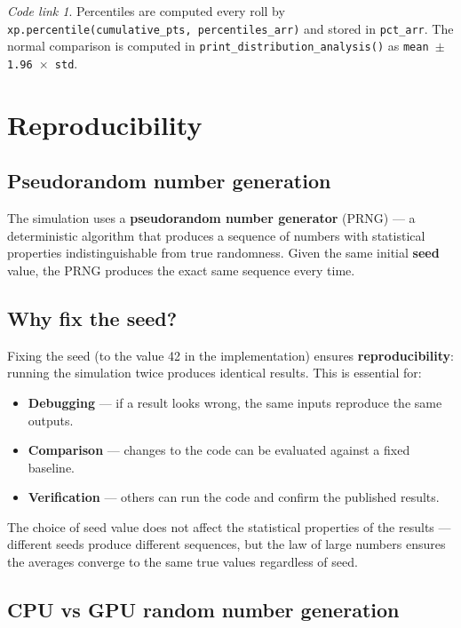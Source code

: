 \documentclass[11pt,a4paper]{article}
\theoremstyle{remark}
\newtheorem*{codelink}{Code link}
\begin{document}
\begin{codelink}
Percentiles are computed every roll by \texttt{xp.percentile(cumulative\_pts, percentiles\_arr)} and stored in \texttt{pct\_arr}. The normal comparison is computed in \texttt{print\_distribution\_analysis()} as \texttt{mean $\pm$ 1.96 $\times$ std}.
\end{codelink}

\section{Reproducibility}

\subsection{Pseudorandom number generation}

The simulation uses a \textbf{pseudorandom number generator} (PRNG) --- a deterministic algorithm that produces a sequence of numbers with statistical properties indistinguishable from true randomness. Given the same initial \textbf{seed} value, the PRNG produces the exact same sequence every time.

\subsection{Why fix the seed?}

Fixing the seed (to the value 42 in the implementation) ensures \textbf{reproducibility}: running the simulation twice produces identical results. This is essential for:
\begin{itemize}[itemsep=4pt]
\item \textbf{Debugging} --- if a result looks wrong, the same inputs reproduce the same outputs.
\item \textbf{Comparison} --- changes to the code can be evaluated against a fixed baseline.
\item \textbf{Verification} --- others can run the code and confirm the published results.
\end{itemize}

The choice of seed value does not affect the statistical properties of the results --- different seeds produce different sequences, but the law of large numbers ensures the averages converge to the same true values regardless of seed.

\subsection{CPU vs GPU random number generation}
\end{document}
